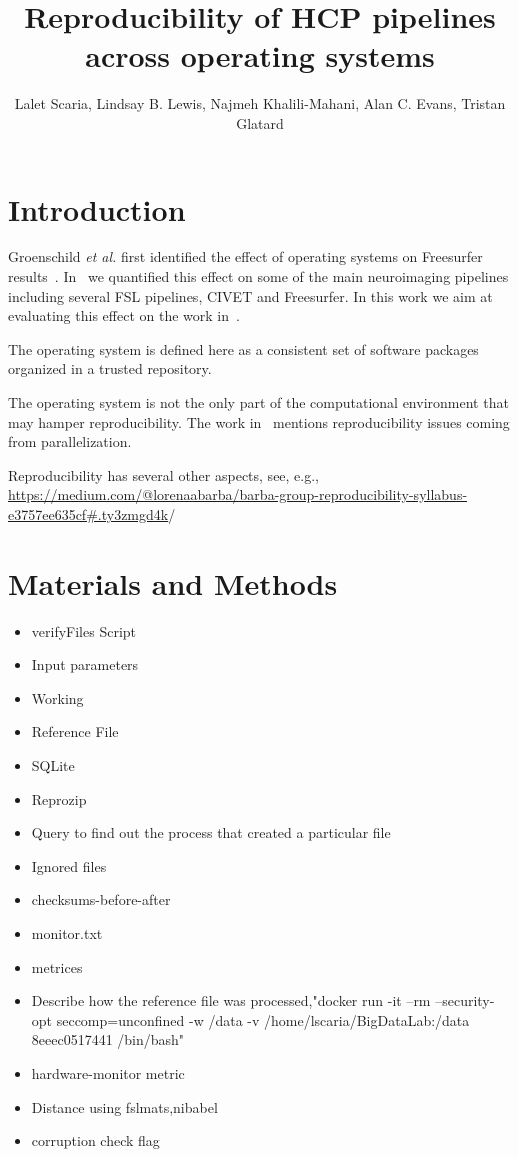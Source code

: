 \documentclass{article}
\title{Reproducibility of HCP pipelines across operating systems}
\author{Lalet Scaria, Lindsay B. Lewis, Najmeh Khalili-Mahani, Alan C. Evans, Tristan Glatard}
\begin{document}
\maketitle


\section{Introduction}

Groenschild \emph{et al.} first identified the effect of operating
systems on Freesurfer
results~\cite{Gronenschild2012}. In~\cite{10.3389/fninf.2015.00012} we
quantified this effect on some of the main neuroimaging pipelines
including several FSL pipelines, CIVET and Freesurfer. In this work we
aim at evaluating this effect on the work in~\cite{glasser2015multi}.

The operating system is defined here as a consistent set of software
packages organized in a trusted repository.

The operating system is not the only part of the computational
environment that may hamper reproducibility. The work
in~\cite{diethelm2012limits} mentions reproducibility issues coming
from parallelization.

Reproducibility has several other aspects, see, e.g.,
\url{https://medium.com/@lorenaabarba/barba-group-reproducibility-syllabus-e3757ee635cf#.ty3zmgd4k}/

\section{Materials and Methods}
\begin{itemize}
  \item{verifyFiles Script}
  \item{Input parameters}
  \item{Working}
  \item{Reference File}
  \item{SQLite}
  \item{Reprozip}
  \item{Query to find out the process that created a particular file}
  \item{Ignored files}
  \item{checksums-before-after}
  \item{monitor.txt}
  \item{metrices}
  \item{Describe how the reference file was processed,"docker run -it --rm --security-opt seccomp=unconfined -w /data -v /home/lscaria/BigDataLab:/data 8eeec0517441 /bin/bash"}
  \item{hardware-monitor metric}
  \item{Distance using fslmats,nibabel}
  \item{corruption check flag}
\end{itemize}
\end{document}
